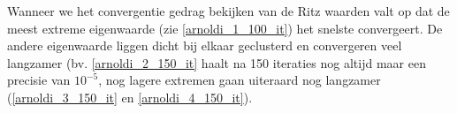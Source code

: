 Wanneer we het convergentie gedrag bekijken van de Ritz waarden valt op dat de meest extreme eigenwaarde (zie \ref{arnoldi_1_100_it}) het snelste convergeert. De andere eigenwaarde liggen dicht bij elkaar geclusterd en convergeren veel langzamer (bv. \ref{arnoldi_2_150_it} haalt na 150 iteraties nog altijd maar een precisie van $10^{-5}$, nog lagere extremen gaan uiteraard nog langzamer (\ref{arnoldi_3_150_it} en \ref{arnoldi_4_150_it}).
\begin{figure}[H]
  \centering
  \hfill
\end{figure}

\begin{figure}[H]
  \centering
  \hfill
\end{figure}

